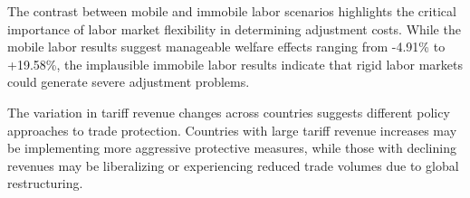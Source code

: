 The contrast between mobile and immobile labor scenarios highlights the critical importance of labor market flexibility in determining adjustment costs. While the mobile labor results suggest manageable welfare effects ranging from -4.91\% to +19.58\%, the implausible immobile labor results indicate that rigid labor markets could generate severe adjustment problems.

The variation in tariff revenue changes across countries suggests different policy approaches to trade protection. Countries with large tariff revenue increases may be implementing more aggressive protective measures, while those with declining revenues may be liberalizing or experiencing reduced trade volumes due to global restructuring.
